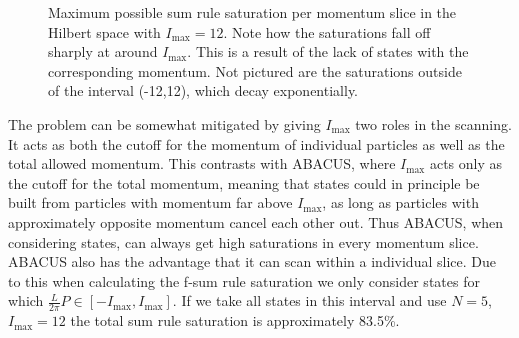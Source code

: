 \documentclass[11pt, a4paper]{report} %
\begin{document}
\begin{figure}[tb!]
  \centering
   \caption{Maximum possible sum rule saturation per momentum slice in the Hilbert space with \(I_{\max}=12\). Note how the saturations fall off sharply at around \(I_{\max}\). This is a result of the lack of states with the corresponding momentum. Not pictured are the saturations outside of the interval (-12,12), which decay exponentially.}\label{fig:saturationsperslice}
\end{figure}


The problem can be somewhat mitigated by giving \(I_{\max}\) two roles in the scanning.
It acts as both the cutoff for the momentum of individual particles as well as the total allowed momentum.
This contrasts with ABACUS, where \(I_{\max}\) acts only as the cutoff for the total momentum, meaning that states could in principle be built from particles with momentum far above \(I_{\max}\), as long as particles with approximately opposite momentum cancel each other out.
Thus ABACUS, when considering states, can always get high saturations in every momentum slice.
ABACUS also has the advantage that it can scan within a individual slice.
Due to this when calculating the f-sum rule saturation we only consider states for which \(\frac{L}{2\pi}P \in [-I_{\max},I_{\max}]\).
If we take all states in this interval and use \(N = 5\), \(I_{\max}=12\) the total sum rule saturation is approximately 83.5\%.
\end{document}
